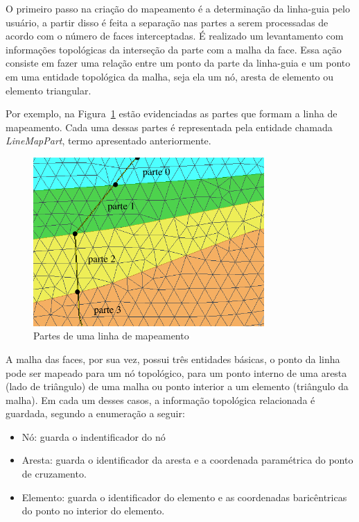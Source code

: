 O primeiro passo na criação do mapeamento é a determinação da linha-guia pelo usuário, a partir disso é feita a separação nas partes a serem processadas de acordo com o número de faces interceptadas. É realizado um levantamento com informações topológicas da interseção da parte com a malha da face. Essa ação consiste em fazer uma relação entre um ponto da parte da linha-guia e um ponto em uma entidade topológica da malha, seja ela um nó, aresta de elemento ou elemento triangular.

Por exemplo, na Figura~\ref{fig-linemap-parts} estão evidenciadas as partes que formam a linha de mapeamento. Cada uma dessas partes é representada pela entidade chamada \textit{LineMapPart}, termo apresentado anteriormente.

\begin{figure} [h]
  \begin{center}
    \includegraphics[width=250pt]{images/fig-lm-parts}
    \caption{Partes de uma linha de mapeamento}\label{fig-linemap-parts}
  \end{center}
\end{figure}

A malha das faces, por sua vez, possui três entidades básicas, o ponto da linha pode ser mapeado para um nó topológico, para um ponto interno de uma aresta (lado de triângulo) de uma malha ou ponto interior a um elemento (triângulo da malha). Em cada um desses casos, a informação topológica relacionada é guardada, segundo a enumeração a seguir:

\renewcommand{\labelitemi}{•}
\begin{itemize}
  \item Nó: guarda o indentificador do nó
  \item Aresta: guarda o identificador da aresta e a coordenada paramétrica do ponto de cruzamento.
  \item Elemento: guarda o identificador do elemento e as coordenadas baricêntricas do ponto no interior do elemento.
\end{itemize}

